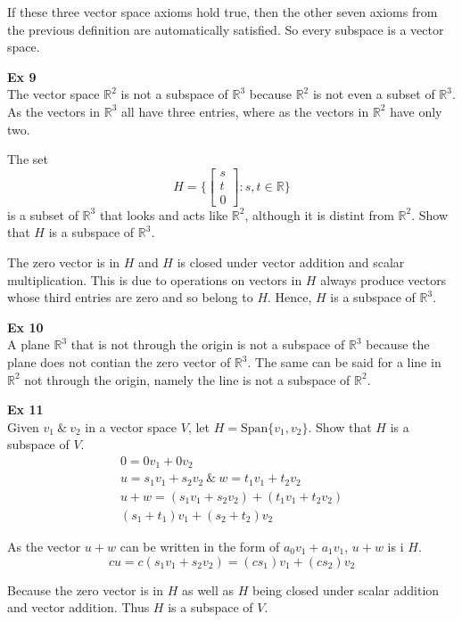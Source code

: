 \documentclass{article}
\begin{document}
    If these three vector space axioms hold true, then the other seven axioms from the previous definition are automatically satisfied. So every subspace is a vector space.

    \textbf{Ex 9}\\
    The vector space $ \mathbb{R}^{2} $ is not a subspace of $ \mathbb{R}^{3} $ because $ \mathbb{R}^{2} $ is not even a subset of $ \mathbb{R}^{3} $. As the vectors in $ \mathbb{R}^{3} $ all have three entries, where as the vectors in $ \mathbb{R}^{2} $ have only two.

    The set
    \[
      H=\{ \begin{bmatrix}
          s\\
          t\\
          0
      \end{bmatrix}: s,t \in \mathbb{R} \}
    \]
    is a subset of $ \mathbb{R}^{3} $ that looks and acts like $ \mathbb{R}^{2} $, although it is distint from $ \mathbb{R}^{2}  $. Show that $ H $ is a subspace of $ \mathbb{R}^{3} $.

    The zero vector is in $ H $ and $ H $ is closed under vector addition and scalar multiplication. This is due to operations on vectors in $ H $ always produce vectors whose third entries are zero and so belong to $ H $. Hence, $ H $ is a subspace of $ \mathbb{R}^{3} $.

  \textbf{Ex 10}\\
  A plane $ \mathbb{R}^{3} $ that is not through the origin is not a subspace of $ \mathbb{R}^{3} $ because the plane does not contian the zero vector of $ \mathbb{R}^{3} $. The same can be said for a line in $ \mathbb{R}^{2} $ not through the origin, namely the line is not a subspace of $ \mathbb{R}^{2} $.

  \textbf{Ex 11}\\
  Given $ v_1 ~\&~ v_2 $ in a vector space $ V $, let $ H=\text{Span}\{ v_1 ,v_2\} $. Show that $ H $ is a subspace of $ V $.
  \[
    \begin{gathered}
    0=0v_1 + 0v_2\\
    u=s_1v_1 + s_2 v_2 ~\&~ w=t_1v_1 + t_2v_2\\
    u+w = (s_1v_1+s_2v_2) + (t_1v_1+t_2v_2)\\
    (s_1+t_1)v_1 + (s_2+t_2)v_2
    \end{gathered}
  \]

  As the vector $ u+w $ can be written in the form of $ a_0v_1 + a_1v_1 $, $ u+w $ is i $ H $.
  \[
    cu=c(s_1v_1+s_2v_2)=(cs_1)v_1+(cs_2)v_2
  \]

  Because the zero vector is in $ H $ as well as $ H $ being closed under scalar addition and vector addition. Thus $ H $ is a subspace of $ V $.
\end{document}
